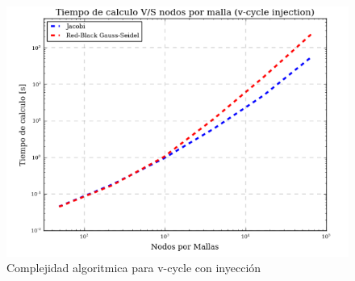 \documentclass[letter,10pt]{article}
\begin{document}
\begin{figure}
\centering
\includegraphics[scale=0.8]{img/tvsnvcin}
\caption{Complejidad algoritmica para v-cycle con inyección}
\label{comtvsnvcin}
\end{figure}
\end{document}
